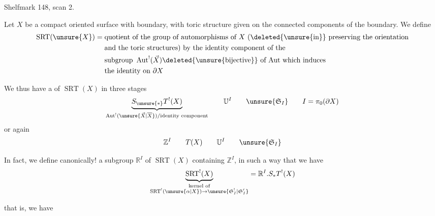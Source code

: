 Shelfmark 148, scan 2.



Let $X$ be a compact oriented surface with boundary, with toric structure
given on the connected components of the boundary.
We define
\[
\begin{aligned}
\operatorname{SRT}(\unsure{X})={}&
\text{quotient of the group of automorphisms of }X
\text{ (\deleted{\unsure{in}} preserving the orientation}\\
&\text{and the toric structures) by the identity component of the}\\
&\text{subgroup }\operatorname{Aut}^!(\vec X)
\deleted{\unsure{\mathrm{bijective}}}
\text{ of Aut which induces}\\
&\text{the identity on }\partial X
\end{aligned}
\]

We thus have a  of $\operatorname{SRT}(X)$ in three stages
\[
\underbrace{S_{\unsure{*}}T^!(X)}_{
\operatorname{Aut}^!(\unsure{\vec X|\overline X})/
\text{identity component}}
\qquad\mathbb U^I\qquad\unsure{\mathfrak S_I}
\qquad I=\pi_0(\partial X)
\]
or again
\[
\mathbb Z^I\qquad T(X)\qquad\mathbb U^I\qquad\unsure{\mathfrak S_I}
\]

In fact, we define canonically! a  subgroup
$\mathbb R^I$ of $\operatorname{SRT}(X)$
containing $\mathbb Z^I$, in such a way that we have
\[
\underbrace{\operatorname{SRT}^!(X)}_{
\substack{\text{kernel of}\\
\operatorname{SRT}^!(\unsure{\alpha|X})\to\unsure{\mathfrak S_I^!|\mathfrak S_I'}}}
=\mathbb R^I.S_*T^!(X)
\]


that is, we have



